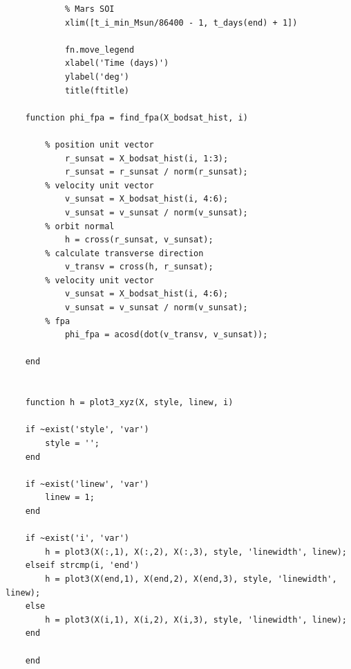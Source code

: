 \documentclass[conf]{new-aiaa}
\begin{document}
\begin{lstlisting}
            % Mars SOI 
            xlim([t_i_min_Msun/86400 - 1, t_days(end) + 1])
            
            fn.move_legend 
            xlabel('Time (days)') 
            ylabel('deg') 
            title(ftitle) 
            
    function phi_fpa = find_fpa(X_bodsat_hist, i)
        
        % position unit vector 
            r_sunsat = X_bodsat_hist(i, 1:3); 
            r_sunsat = r_sunsat / norm(r_sunsat); 
        % velocity unit vector 
            v_sunsat = X_bodsat_hist(i, 4:6); 
            v_sunsat = v_sunsat / norm(v_sunsat); 
        % orbit normal 
            h = cross(r_sunsat, v_sunsat); 
        % calculate transverse direction 
            v_transv = cross(h, r_sunsat); 
        % velocity unit vector 
            v_sunsat = X_bodsat_hist(i, 4:6); 
            v_sunsat = v_sunsat / norm(v_sunsat); 
        % fpa 
            phi_fpa = acosd(dot(v_transv, v_sunsat)); 
    
    end 
    
        
    function h = plot3_xyz(X, style, linew, i)
    
    if ~exist('style', 'var') 
        style = ''; 
    end 
    
    if ~exist('linew', 'var')
        linew = 1; 
    end 
    
    if ~exist('i', 'var')
        h = plot3(X(:,1), X(:,2), X(:,3), style, 'linewidth', linew); 
    elseif strcmp(i, 'end')
        h = plot3(X(end,1), X(end,2), X(end,3), style, 'linewidth', linew);     
    else
        h = plot3(X(i,1), X(i,2), X(i,3), style, 'linewidth', linew); 
    end 
    
    end 
    
	
\end{lstlisting}






% 
\end{document}
